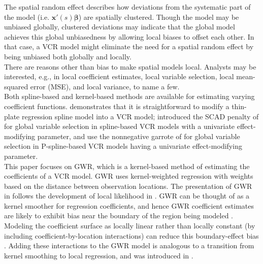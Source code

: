 \documentclass[authoryear, review, 11pt]{elsarticle}
\begin{document}
	The spatial random effect describes how deviations from the systematic part of the model (i.e. $\bm{x}'(s)\bm{\beta}$) are spatially clustered. Though the model may be unbiased globally, clustered deviations may indicate that the global model achieves this global unbiasedness by allowing local biases to offset each other. In that case, a VCR model might eliminate the need for a spatial random effect by being unbiased both globally and locally.\\

	There are reasons other than bias to make spatial models local. Analysts may be interested, e.g., in local coefficient estimates, local variable selection, local mean-squared error (MSE), and local variance, to name a few.\\
	
	Both spline-based \citep{Wood:2006} and kernel-based \citep{Fan:1999, Loader:1999} methods are available for estimating varying coefficient functions. \cite{Wood:2006} demonstrates that it is straightforward to modify a thin-plate regression spline model into a VCR model; \cite{Wang:2008a} introduced the SCAD penalty of \cite{Fan:2001} for global variable selection in spline-based VCR models with a univariate effect-modifying parameter, and \cite{Antoniadis:2012a} use the nonnegative garrote of \cite{Breiman:1995} for global variable selection in P-spline-based VCR models having a univariate effect-modifying parameter.\\
	
	This paper focuses on GWR, which is a kernel-based method of estimating the coefficients of a VCR model. GWR uses kernel-weighted regression with weights based on the distance between observation locations. The presentation of GWR in \cite{Fotheringham:2002} follows the development of local likelihood in \cite{Loader:1999}. GWR can be thought of as a kernel smoother for regression coefficients, and hence GWR coefficient estimates are likely to exhibit bias near the boundary of the region being modeled \citep{Hastie:1993b}. Modeling the coefficient surface as locally linear rather than locally constant (by including coefficient-by-location interactions) can reduce this boundary-effect bias \citep{Hastie:1993b}. Adding these interactions to the GWR model is analogous to a transition from kernel smoothing to local regression, and was introduced in \cite{Wang:2008b}.\\
\end{document}
